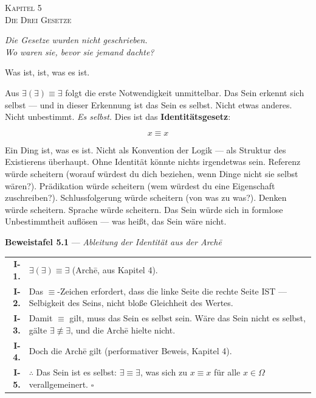 \documentclass[10pt, openany, oneside]{book}
\renewcommand{\footnotesize}{\fontsize{8.5}{11}\selectfont}
\renewcommand{\large}{\fontsize{11.5}{14}\selectfont}
\renewcommand{\huge}{\fontsize{17}{21}\selectfont}
\begin{document}
\newpage

\begin{center}
    {\huge\scshape Kapitel 5}\\[0.3em]
    {\large\scshape Die Drei Gesetze}
\end{center}

\vspace{1.5em}

\begin{center}
    \itshape
    Die Gesetze wurden nicht geschrieben.\\
    Wo waren sie, bevor sie jemand dachte?
\end{center}

\vspace{2em}


\noindent Was ist, ist, was es ist.

Aus $\exists(\exists) \equiv \exists$ folgt die erste Notwendigkeit unmittelbar. Das Sein erkennt sich selbst --- und in dieser Erkennung ist das Sein es selbst. Nicht etwas anderes. Nicht unbestimmt. \textit{Es selbst.} Dies ist das \textbf{Identitätsgesetz}:

$$x \equiv x$$

Ein Ding ist, was es ist. Nicht als Konvention der Logik --- als Struktur des Existierens überhaupt. Ohne Identität könnte nichts irgendetwas sein. Referenz würde scheitern (worauf würdest du dich beziehen, wenn Dinge nicht sie selbst wären?). Prädikation würde scheitern (wem würdest du eine Eigenschaft zuschreiben?). Schlussfolgerung würde scheitern (von was zu was?). Denken würde scheitern. Sprache würde scheitern. Das Sein würde sich in formlose Unbestimmtheit auflösen --- was heißt, das Sein wäre nicht.

\vspace{0.5em}

\textbf{Beweistafel 5.1} --- \textit{Ableitung der Identität aus der Arch\={e}}

\vspace{0.5em}

{\footnotesize
\noindent\begin{tabular}{r p{}}
\textbf{I-1.} & $\exists(\exists) \equiv \exists$ (Arch\={e}, aus Kapitel 4). \\[0.3em]
\textbf{I-2.} & Das $\equiv$-Zeichen erfordert, dass die linke Seite die rechte Seite IST --- Selbigkeit des Seins, nicht bloße Gleichheit des Wertes. \\[0.3em]
\textbf{I-3.} & Damit $\equiv$ gilt, muss das Sein es selbst sein. Wäre das Sein nicht es selbst, gälte $\exists \not\equiv \exists$, und die Arch\={e} hielte nicht. \\[0.3em]
\textbf{I-4.} & Doch die Arch\={e} gilt (performativer Beweis, Kapitel 4). \\[0.3em]
\textbf{I-5.} & $\therefore$ Das Sein ist es selbst: $\exists \equiv \exists$, was sich zu $x \equiv x$ für alle $x \in \Omega$ verallgemeinert. $\square$ \\[0.3em]
\end{tabular}
}
\end{document}
